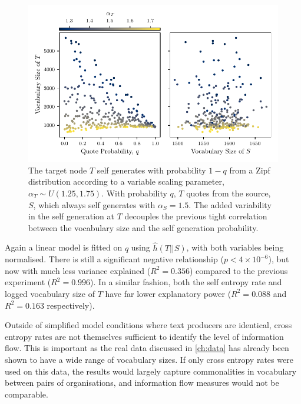 \begin{figure}[!htbp]
\centering
\includegraphics{chapter3/figs/VariableAlphaVocabSize.pdf}
\caption{The target node $T$ self generates with probability $1-q$ from a Zipf distribution according to a variable scaling parameter, $\alpha_T \sim U(1.25, 1.75)$. With probability $q$, $T$ quotes from the source, $S$, which always self generates with $\alpha_S = 1.5$. The added variability in the self generation at $T$ decouples the previous tight correlation between the vocabulary size and the self generation probability. }\label{fig:flow_variablealphascatterplot}
\end{figure}

Again a linear model is fitted on $q$ using $\hat{h}(T||S)$, with both variables being normalised. There is still a significant negative relationship ($p< 4\times10^{-6}$), but now with much less variance explained ($R^2 = 0.356$) compared to the previous experiment ($R^2=0.996$). In a similar fashion, both the self entropy rate and logged vocabulary size of $T$ have far lower explanatory power ($R^2=0.088$ and $R^2=0.163$ respectively).

Outside of simplified model conditions where text producers are identical, cross entropy rates are not themselves sufficient to identify the level of information flow. This is important as the real data discussed in \autoref{ch:data} has already been shown to have a wide range of vocabulary sizes. If only cross entropy rates were used on this data, the results would largely capture commonalities in vocabulary between pairs of organisations, and information flow measures would not be comparable. 


